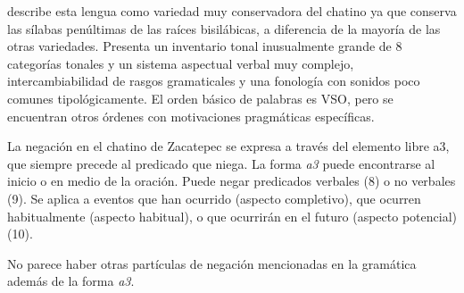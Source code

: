 \textcolor{MidnightBlue}{\citet{chatino}} describe esta lengua como variedad muy conservadora del chatino ya que conserva las sílabas penúltimas de las raíces bisilábicas, a diferencia de la mayoría de las otras variedades. Presenta un inventario tonal inusualmente grande de 8 categorías tonales y un sistema aspectual verbal muy complejo, intercambiabilidad de rasgos gramaticales y una fonología con sonidos poco comunes tipológicamente. El orden básico de palabras es VSO, pero se encuentran otros órdenes con motivaciones pragmáticas específicas.

La negación en el chatino de Zacatepec se expresa a través del elemento libre a3, que siempre precede al predicado que niega. La forma \textit{a3} puede encontrarse al inicio o en medio de la oración. Puede negar predicados verbales (8) o no verbales (9). Se aplica a eventos que han ocurrido (aspecto completivo), que ocurren habitualmente (aspecto habitual), o que ocurrirán en el futuro (aspecto potencial) (10).

No parece haber otras partículas de negación mencionadas en la gramática además de la forma \textit{a3}.
